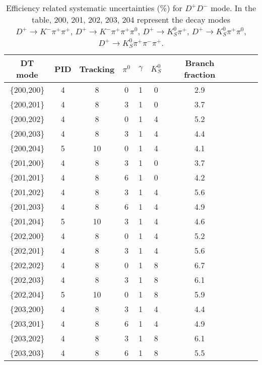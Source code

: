 \documentclass[aps,preprint,tightenlines,superscriptaddress,showpacs,byrevtex,amsmath,amssymb,nofloatfix]{revtex4}
\begin{document}
\begin{table}[!htbp]
\captionsetup{justification=raggedright}
\caption{Efficiency related systematic uncertainties (\%)  for $D^{+}D^{-}$ mode. In the table, 200, 201, 202, 203, 204 represent the decay modes $D^{+} \rightarrow K^{-}\pi^{+}\pi^{+}$, $D^{+} \rightarrow K^{-}\pi^{+}\pi^{+}\pi^{0}$, $D^{+} \rightarrow K^{0}_{S}\pi^{+}$, $D^{+} \rightarrow K^{0}_{S}\pi^{+}\pi^{0}$, $D^{+} \rightarrow K^{0}_{S}\pi^{+}\pi^{-}\pi^{+}$.}
\label{efficiency Dpmode}
\begin{tabular}{c c c c c c c c c c}
\hline \hline
    DT mode  &PID  &Tracking  &$\pi^{0}$ &$\gamma$ &$K^{0}_{S}$  &Branch fraction   \\
    \hline
     \{200,200\}   &4    &8      &0   &1   &0   &2.9        \\
     \{200,201\}   &4    &8      &3   &1   &0   &3.7        \\
     \{200,202\}   &4    &8      &0   &1   &4   &5.2        \\
     \{200,203\}   &4    &8      &3   &1   &4   &4.4        \\
     \{200,204\}   &5    &10     &0   &1   &4   &4.1        \\
     \{201,200\}   &4    &8      &3   &1   &0   &3.7        \\
     \{201,201\}   &4    &8      &6   &1   &0   &4.2        \\
     \{201,202\}   &4    &8      &3   &1   &4   &5.6       \\
     \{201,203\}   &4    &8      &6   &1   &4   &4.9        \\
     \{201,204\}   &5    &10     &3   &1   &4   &4.6        \\
     \{202,200\}   &4    &8      &0   &1   &4   &5.2        \\
     \{202,201\}   &4    &8      &3   &1   &4   &5.6        \\
     \{202,202\}   &4    &8      &0   &1   &8   &6.7        \\
     \{202,203\}   &4    &8      &3   &1   &8   &6.1        \\
     \{202,204\}   &5    &10     &0   &1   &8   &5.9        \\
     \{203,200\}   &4    &8      &3   &1   &4   &4.4        \\
     \{203,201\}   &4    &8      &6   &1   &4   &4.9        \\
     \{203,202\}   &4    &8      &3   &1   &8   &6.1        \\
     \{203,203\}   &4    &8      &6   &1   &8   &5.5        \\

\end{tabular}
\end{table}
\end{document}

